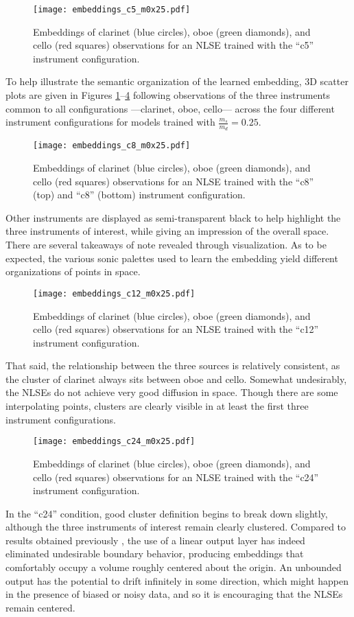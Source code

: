 \begin{figure}[t!]
\centering
\texttt{[image: embeddings\_c5\_m0x25.pdf]}
\caption{Embeddings of clarinet (blue circles), oboe (green diamonds), and cello (red squares) observations for an NLSE trained with the ``c5'' instrument configuration.}
\label{fig:embeddings_c5_m0x25}
\end{figure}

To help illustrate the semantic organization of the learned embedding, 3D scatter plots are given in Figures \ref{fig:embeddings_c5_m0x25}--\ref{fig:embeddings_c24_m0x25} following observations of the three instruments common to all configurations ---clarinet, oboe, cello--- across the four different instrument configurations for models trained with $\frac{m_s}{m_d} = 0.25$.
\begin{figure}[t!]
\centering
\texttt{[image: embeddings\_c8\_m0x25.pdf]}
\caption{Embeddings of clarinet (blue circles), oboe (green diamonds), and cello (red squares) observations for an NLSE trained with the ``c8'' (top) and ``c8'' (bottom) instrument configuration.}
\label{fig:embeddings_c8_m0x25}
\end{figure}
Other instruments are displayed as semi-transparent black to help highlight the three instruments of interest, while giving an impression of the overall space.
There are several takeaways of note revealed through visualization.
As to be expected, the various sonic palettes used to learn the embedding yield different organizations of points in space.
\begin{figure}[t!]
\centering
\texttt{[image: embeddings\_c12\_m0x25.pdf]}
\caption{Embeddings of clarinet (blue circles), oboe (green diamonds), and cello (red squares) observations for an NLSE trained with the ``c12'' instrument configuration.}
\label{fig:embeddings_c12_m0x25}
\end{figure}
That said, the relationship between the three sources is relatively consistent, as the cluster of clarinet always sits between oboe and cello.
Somewhat undesirably, the NLSEs do not achieve very good diffusion in space.
Though there are some interpolating points, clusters are clearly visible in at least the first three instrument configurations.
\begin{figure}[t!]
\centering
\texttt{[image: embeddings\_c24\_m0x25.pdf]}
\caption{Embeddings of clarinet (blue circles), oboe (green diamonds), and cello (red squares) observations for an NLSE trained with the ``c24'' instrument configuration.}
\label{fig:embeddings_c24_m0x25}
\end{figure}
In the ``c24'' condition, good cluster definition begins to break down slightly, although the three instruments of interest remain clearly clustered.
Compared to results obtained previously \cite{Humphrey2011Nonlinear}, the use of a linear output layer has indeed eliminated undesirable boundary behavior, producing embeddings that comfortably occupy a volume roughly centered about the origin.
An unbounded output has the potential to drift infinitely in some direction, which might happen in the presence of biased or noisy data, and so it is encouraging that the NLSEs remain centered.

